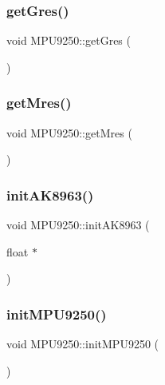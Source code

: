 \subsubsection{\texorpdfstring{get\+Gres()}{getGres()}}
{\footnotesize\ttfamily void M\+P\+U9250\+::get\+Gres (\begin{DoxyParamCaption}{ }\end{DoxyParamCaption})}

\mbox{\label{classMPU9250_ab6b113da9b2fb006eb44dc8078e699c5}} 
\subsubsection{\texorpdfstring{get\+Mres()}{getMres()}}
{\footnotesize\ttfamily void M\+P\+U9250\+::get\+Mres (\begin{DoxyParamCaption}{ }\end{DoxyParamCaption})}

\mbox{\label{classMPU9250_aab7b6d912fdc88c4fedfad90abe2aeab}} 
\subsubsection{\texorpdfstring{init\+A\+K8963()}{initAK8963()}}
{\footnotesize\ttfamily void M\+P\+U9250\+::init\+A\+K8963 (\begin{DoxyParamCaption}\item[{float $\ast$}]{ }\end{DoxyParamCaption})}

\mbox{\label{classMPU9250_a03803202142ac461867daa9dd06fdd80}} 
\subsubsection{\texorpdfstring{init\+M\+P\+U9250()}{initMPU9250()}}
{\footnotesize\ttfamily void M\+P\+U9250\+::init\+M\+P\+U9250 (\begin{DoxyParamCaption}{ }\end{DoxyParamCaption})}

